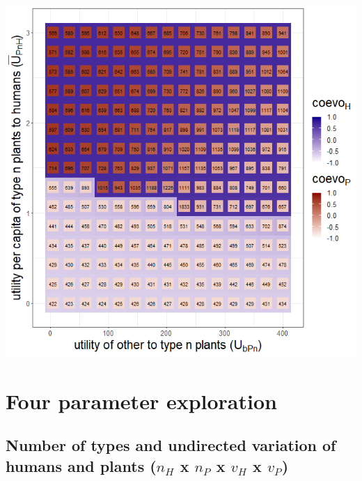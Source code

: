 \documentclass[
]{book}
\begin{document}
\includegraphics[width=1\linewidth]{plots/3_exp_type_n_plants_traits-tripleRaster_twoParameters}

\newpage

\hypertarget{four-parameter-exploration}{%
\chapter{Four parameter exploration}\label{four-parameter-exploration}}

\newpage

\hypertarget{number-of-types-and-undirected-variation-of-humans-and-plants-n_h-x-n_p-x-v_h-x-v_p}{%
\section{\texorpdfstring{Number of types and undirected variation of humans and plants (\(n_{H}\) x \(n_{P}\) x \(v_{H}\) x \(v_{P}\))}{Number of types and undirected variation of humans and plants (n\_\{H\} x n\_\{P\} x v\_\{H\} x v\_\{P\})}}\label{number-of-types-and-undirected-variation-of-humans-and-plants-n_h-x-n_p-x-v_h-x-v_p}}

\end{document}

